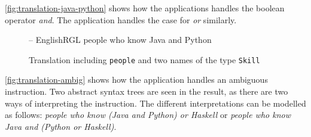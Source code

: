 \autoref{fig:translation-java-python} shows how the applications handles the boolean operator \emph{and}. The application handles the case for \emph{or} similarly.

\begin{figure}[H]
\begin{terminal}
-- EnglishRGL
people who know Java and Python
\end{terminal}
\begin{json-small}
\end{json-small}
\caption{Translation including \texttt{people} and two names of the type \texttt{Skill}\label{fig:translation-java-python}}
\end{figure}

\newpage

\autoref{fig:translation-ambig} shows how the application handles an ambiguous instruction. Two abstract syntax trees are seen in the result, as there are two ways of interpreting the instruction. The different interpretations can be modelled as follows: \emph{people who know (Java and Python) or Haskell} or \emph{people who know Java and (Python or Haskell)}.

